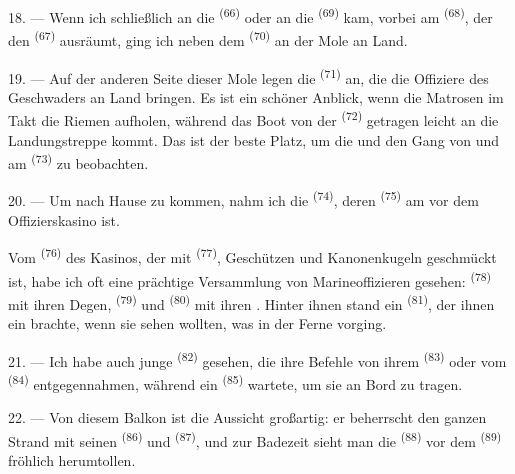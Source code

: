 18. --- Wenn ich schließlich an die  \textsuperscript{(66)} oder
an die  \textsuperscript{(69)} kam, vorbei am 
\textsuperscript{(68)}, der den  \textsuperscript{(67)} ausräumt, ging
ich neben dem  \textsuperscript{(70)} an der Mole an Land.

19. --- Auf der anderen Seite dieser Mole legen die 
\textsuperscript{(71)} an, die die Offiziere des Geschwaders an Land bringen. Es ist
ein schöner Anblick, wenn die Matrosen im Takt die Riemen aufholen, während das Boot
von der  \textsuperscript{(72)} getragen leicht an die Landungstreppe
kommt. Das ist der beste Platz, um die  und den Gang von
 und  am  \textsuperscript{(73)} zu
beobachten.

\VUsaut{3.0mm}
\VUsaut{3.0mm}

20. --- Um nach Hause zu kommen, nahm ich die 
\textsuperscript{(74)}, deren  \textsuperscript{(75)} am
 vor dem Offizierskasino ist.

Vom  \textsuperscript{(76)} des Kasinos, der mit 
\textsuperscript{(77)}, Geschützen und Kanonenkugeln geschmückt ist, habe ich oft
eine prächtige Versammlung von Marineoffizieren gesehen: 
\textsuperscript{(78)} mit ihren Degen, 
\textsuperscript{(79)} und  \textsuperscript{(80)} mit
ihren . Hinter ihnen stand ein 
\textsuperscript{(81)}, der ihnen ein  brachte, wenn sie sehen
wollten, was in der Ferne vorging.

21. --- Ich habe auch junge  \textsuperscript{(82)} gesehen,
die ihre Befehle von ihrem  \textsuperscript{(83)} oder vom
 \textsuperscript{(84)} entgegennahmen, während ein
 \textsuperscript{(85)} wartete, um sie an Bord zu tragen.

22. --- Von diesem Balkon ist die Aussicht großartig: er beherrscht den ganzen
Strand mit seinen  \textsuperscript{(86)} und 
\textsuperscript{(87)}, und zur Badezeit sieht man die 
\textsuperscript{(88)} vor dem  \textsuperscript{(89)} fröhlich
herumtollen.

